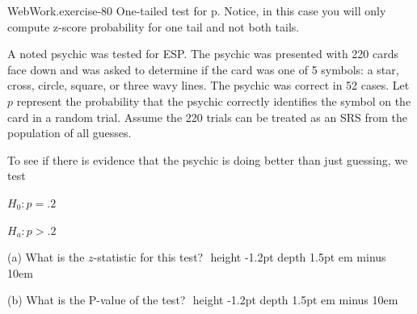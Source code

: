 \documentclass[10pt,]{book}
\newcommand{\fillin}[1]{\leavevmode\leaders\vrule height -1.2pt depth 1.5pt \hskip #1em minus #1em \null}
\numberwithin{equation}{section}
\begin{document}
%
\par
\hypertarget{p-1186}{}%
\begin{inlineexercise}{WebWork.}{exercise-80}%
\hypertarget{p-1187}{}%
One-tailed test for p. Notice, in this case you will only compute z-score probability for one tail and not both tails.%
\par\medskip
\hypertarget{p-1188}{}%
A noted psychic was tested for ESP.  The psychic was presented with 220 cards face down and was asked to determine if the card was one of 5 symbols: a star, cross, circle, square, or three wavy lines.  The psychic was correct in 52 cases.  Let \(p\) represent the probability that the psychic correctly identifies the symbol on the card in a random trial. Assume the 220 trials can be treated as an SRS from the population of all guesses.%
\par
\hypertarget{p-1189}{}%
To see if there is evidence that the psychic is doing better than just guessing, we test%
\par
\hypertarget{p-1190}{}%
\(H_0: p = .2\)%
\par
\hypertarget{p-1191}{}%
\(H_a: p > .2\)%
\par
\hypertarget{p-1192}{}%
(a) What is the \(z\)-statistic for this test? \(\)  \fillin{10}%
\par
\hypertarget{p-1193}{}%
(b) What is the P-value of the test?  \(\)  \fillin{10}%
\end{inlineexercise}
%
%
%
\typeout{************************************************}
\typeout{************************************************}
%
\end{document}
